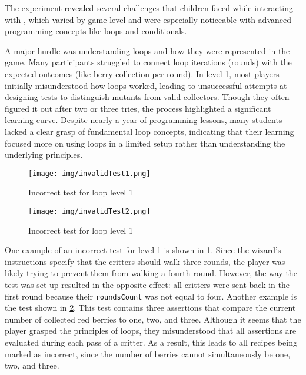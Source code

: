 The experiment revealed several challenges that children faced while interacting with \toolname, which varied by game level and were especially noticeable with advanced programming concepts like loops and conditionals.

A major hurdle was understanding loops and how they were represented in the game. Many participants struggled to connect loop iterations (rounds) with the expected outcomes (like berry collection per round). In level 1, most players initially misunderstood how loops worked, leading to unsuccessful attempts at designing tests to distinguish mutants from valid collectors. Though they often figured it out after two or three tries, the process highlighted a significant learning curve. Despite nearly a year of programming lessons, many students lacked a clear grasp of fundamental loop concepts, indicating that their learning focused more on using loops in a limited setup rather than understanding the underlying principles.

\begin{figure}
	\centering
	\texttt{[image: img/invalidTest1.png]}
	\caption{Incorrect test for loop level 1}
	\label{fig:invalidTest1}
\end{figure}

\begin{figure}
	\centering
	\texttt{[image: img/invalidTest2.png]}
	\caption{Incorrect test for loop level 1}
	\label{fig:invalidTest2}
\end{figure}

One example of an incorrect test for level 1 is shown in \cref{fig:invalidTest1}. Since the wizard's instructions specify that the critters should walk three rounds, the player was likely trying to prevent them from walking a fourth round. However, the way the test was set up resulted in the opposite effect: all critters were sent back in the first round because their \texttt{roundsCount} was not equal to four. Another example is the test shown in \cref{fig:invalidTest2}. This test contains three assertions that compare the current number of collected red berries to one, two, and three. Although it seems that the player grasped the principles of loops, they misunderstood that all assertions are evaluated during each pass of a critter. As a result, this leads to all recipes being marked as incorrect, since the number of berries cannot simultaneously be one, two, and three.

